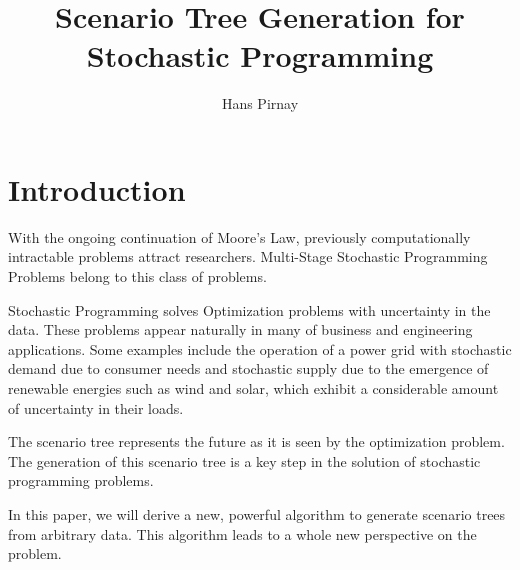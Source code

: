 \documentclass[12pt,onecolumn,headsepline,numbers=noenddot,bibliography=totoc,oneside,a4paper,fleqn,BCOR8mm] {scrartcl}
\begin{document}
\listoftodos
\newpage
\title{Scenario Tree Generation for Stochastic Programming}
\author{Hans Pirnay}
\maketitle
\tableofcontents
\newpage
\section{Introduction}
With the ongoing continuation of Moore's Law, previously computationally intractable problems attract researchers. Multi-Stage Stochastic Programming Problems belong to this class of problems.

Stochastic Programming solves Optimization problems with uncertainty in the data. These problems appear naturally in many of business and engineering applications. Some examples include the operation of a power grid with stochastic demand due to consumer needs and stochastic supply due to the emergence of renewable energies such as wind and solar, which exhibit a considerable amount of uncertainty in their loads.

The scenario tree represents the future as it is seen by the optimization problem.
The generation of this scenario tree is a key step in the solution of stochastic programming problems.

In this paper, we will derive a new, powerful algorithm to generate scenario trees from arbitrary data.
This algorithm leads to a whole new perspective on the problem.
\end{document}
